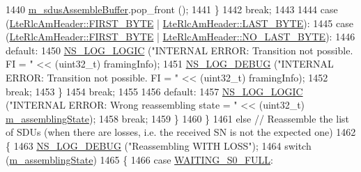 \begin{DoxyCode}
1440                                   \hyperlink{classns3_1_1LteRlcAm_a075262ee7d8d49e97ab0c48b5e763bf1}{m\_sdusAssembleBuffer}.pop\_front ();
1441                                 \}
1442                       \textcolor{keywordflow}{break};
1443 
1444                       \textcolor{keywordflow}{case} (\hyperlink{classns3_1_1LteRlcAmHeader_af42d22f1202bd0d8fa1f4cd0494b8b29a3b7a1fc289b74db76f2e76194d289a24}{LteRlcAmHeader::FIRST\_BYTE} | 
      \hyperlink{classns3_1_1LteRlcAmHeader_af0fb4ccf208128c7cf9dcabf02593749afae5968023949559fdf8d8ad9feb81cd}{LteRlcAmHeader::LAST\_BYTE}):
1445                       \textcolor{keywordflow}{case} (\hyperlink{classns3_1_1LteRlcAmHeader_af42d22f1202bd0d8fa1f4cd0494b8b29a3b7a1fc289b74db76f2e76194d289a24}{LteRlcAmHeader::FIRST\_BYTE} | 
      \hyperlink{classns3_1_1LteRlcAmHeader_af0fb4ccf208128c7cf9dcabf02593749af3f3cbb1727324b59b486aa955ce28f8}{LteRlcAmHeader::NO\_LAST\_BYTE}):
1446                       \textcolor{keywordflow}{default}:
1450                               \hyperlink{group__logging_ga88acd260151caf2db9c0fc84997f45ce}{NS\_LOG\_LOGIC} (\textcolor{stringliteral}{"INTERNAL ERROR: Transition not possible. FI = "} <<
       (uint32\_t) framingInfo);
1451                               \hyperlink{group__logging_ga413f1886406d49f59a6a0a89b77b4d0a}{NS\_LOG\_DEBUG} (\textcolor{stringliteral}{"INTERNAL ERROR: Transition not possible. FI = "} <<
       (uint32\_t) framingInfo);
1452                       \textcolor{keywordflow}{break};
1453                     \}
1454           \textcolor{keywordflow}{break};
1455 
1456           \textcolor{keywordflow}{default}:
1457                 \hyperlink{group__logging_ga88acd260151caf2db9c0fc84997f45ce}{NS\_LOG\_LOGIC} (\textcolor{stringliteral}{"INTERNAL ERROR: Wrong reassembling state = "} << (uint32\_t) 
      \hyperlink{classns3_1_1LteRlcAm_ab6d2954b419df60fc8f8df012fa2709c}{m\_assemblingState});
1458           \textcolor{keywordflow}{break};
1459         \}
1460     \}
1461   \textcolor{keywordflow}{else} \textcolor{comment}{// Reassemble the list of SDUs (when there are losses, i.e. the received SN is not the expected one)}
1462     \{
1463     \hyperlink{group__logging_ga413f1886406d49f59a6a0a89b77b4d0a}{NS\_LOG\_DEBUG} (\textcolor{stringliteral}{"Reassembling WITH LOSS"});
1464     \textcolor{keywordflow}{switch} (\hyperlink{classns3_1_1LteRlcAm_ab6d2954b419df60fc8f8df012fa2709c}{m\_assemblingState})
1465         \{
1466           \textcolor{keywordflow}{case} \hyperlink{classns3_1_1LteRlcAm_a43eeebdccf778e2247c956481ed03d62a832e01ad620b816d8bc1fe1b3fea8708}{WAITING\_S0\_FULL}:

\end{DoxyCode}
